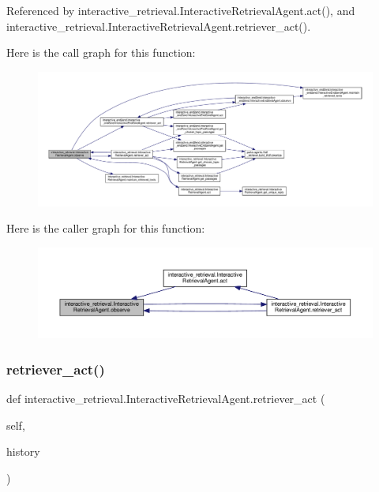 Referenced by interactive\+\_\+retrieval.\+Interactive\+Retrieval\+Agent.\+act(), and interactive\+\_\+retrieval.\+Interactive\+Retrieval\+Agent.\+retriever\+\_\+act().

Here is the call graph for this function\+:
\nopagebreak
\begin{figure}[H]
\begin{center}
\leavevmode
\includegraphics[width=350pt]{classinteractive__retrieval_1_1InteractiveRetrievalAgent_ac8b7ac5b6dbc150f066995b25368d9bd_cgraph}
\end{center}
\end{figure}
Here is the caller graph for this function\+:
\nopagebreak
\begin{figure}[H]
\begin{center}
\leavevmode
\includegraphics[width=350pt]{classinteractive__retrieval_1_1InteractiveRetrievalAgent_ac8b7ac5b6dbc150f066995b25368d9bd_icgraph}
\end{center}
\end{figure}
\mbox{\label{classinteractive__retrieval_1_1InteractiveRetrievalAgent_a07ae26123c56441549800bd116a86626}} 
\subsubsection{\texorpdfstring{retriever\+\_\+act()}{retriever\_act()}}
{\footnotesize\ttfamily def interactive\+\_\+retrieval.\+Interactive\+Retrieval\+Agent.\+retriever\+\_\+act (\begin{DoxyParamCaption}\item[{}]{self,  }\item[{}]{history }\end{DoxyParamCaption})}

